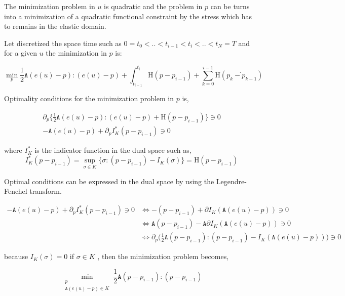 \documentclass[10pt,oneside]{memoir}
\begin{document}
The minimization problem in $u$ is quadratic and the problem in $p$ can be turns into a minimization of a quadratic functional constraint by the stress which has to remains in the elastic domain.

Let discretized the space time such as $0=t_0<..<t_{i-1}<t_i<..<t_N=T$ and for a given $u$ the minimization in $p$ is:

$$\min_{p}   \frac{1}{2} \mathtt{A} (e(u)-p) :  (e(u)-p) + \int_{t_{i-1}}^{t_i} \mathrm{H} (p-p_{i-1}) + \sum_{k=0}^{i-1} \mathrm{H} (\dot{p_k-p_{k-1}}) $$

Optimality conditions for the minimization problem in $p$ is, 

\begin{equation}
\begin{split}
\partial_p \{  \frac{1}{2}\mathtt{A} (e(u)-p):(e(u)-p) + \mathrm{H}(p-p_{i-1}) \} \ni 0 \\
-\mathtt{A} (e(u)-p) + \partial_p I^*_K(p-p_{i-1}) \ni 0
\end{split}
\end{equation}

where $I^{*}_K$ is the indicator function in the dual space such as, $$I^*_K(p-p_{i-1})= \sup_{\sigma \in K} \{ \sigma:(p-p_{i-1}) - I_K(\sigma)  \} = \mathrm{H}(p-p_{i-1})$$


Optimal conditions can be expressed in the dual space by using the Legendre-Fenchel transform.


\begin{equation}
\begin{split}
-\mathtt{A} (e(u)-p) + \partial_p I^*_K(p-p_{i-1}) \ni 0 & \Leftrightarrow -(p-p_{i-1}) + \partial I_K(\mathtt{A} (e(u)-p)) \ni 0 \\
 & \Leftrightarrow   \mathtt{A}(p-p_{i-1}) - \mathtt{A}\partial I_K (\mathtt{A}(e(u)-p)) \ni 0 \\
& \Leftrightarrow  \partial_p \Big( \frac{1}{2}\mathtt{A}(p-p_{i-1}):(p-p_{i-1}) - I_K (\mathtt{A}(e(u)-p)) \Big) \ni 0
\end{split}
\end{equation}

because $I_K(\sigma) = 0$ if $\sigma \in K$ , then the minimization problem becomes,


$$ \min_{\substack{p \\ \mathtt{A}(e(u)-p) \in K}} \frac{1}{2}\mathtt{A} (p-p_{i-1}):(p-p_{i-1}) $$




\end{document}

